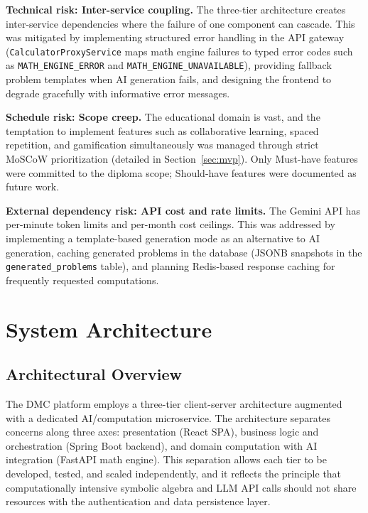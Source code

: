 \textbf{Technical risk: Inter-service coupling.} The three-tier architecture creates inter-service dependencies where the failure of one component can cascade. This was mitigated by implementing structured error handling in the API gateway (\texttt{CalculatorProxyService} maps math engine failures to typed error codes such as \texttt{MATH\_ENGINE\_ERROR} and \texttt{MATH\_ENGINE\_UNAVAILABLE}), providing fallback problem templates when AI generation fails, and designing the frontend to degrade gracefully with informative error messages.

\textbf{Schedule risk: Scope creep.} The educational domain is vast, and the temptation to implement features such as collaborative learning, spaced repetition, and gamification simultaneously was managed through strict MoSCoW prioritization (detailed in Section~\ref{sec:mvp}). Only Must-have features were committed to the diploma scope; Should-have features were documented as future work.

\textbf{External dependency risk: API cost and rate limits.} The Gemini API has per-minute token limits and per-month cost ceilings. This was addressed by implementing a template-based generation mode as an alternative to AI generation, caching generated problems in the database (JSONB snapshots in the \texttt{generated\_problems} table), and planning Redis-based response caching for frequently requested computations.


\section{System Architecture}
\label{sec:architecture}

\subsection{Architectural Overview}
\label{subsec:arch-overview}

The DMC platform employs a three-tier client-server architecture augmented with a dedicated AI/computation microservice. The architecture separates concerns along three axes: presentation (React SPA), business logic and orchestration (Spring Boot backend), and domain computation with AI integration (FastAPI math engine). This separation allows each tier to be developed, tested, and scaled independently, and it reflects the principle that computationally intensive symbolic algebra and LLM API calls should not share resources with the authentication and data persistence layer.


